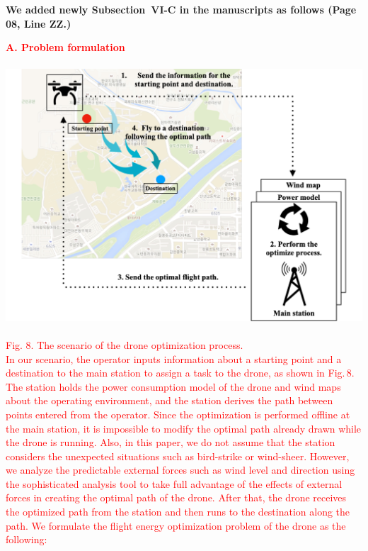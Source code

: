 \documentclass[onecolumn]{IEEEconf}
\begin{document}
\begin{description}
{	}
	~\\
	~\\
	\textbf{We added newly Subsection~VI-C in the manuscripts as follows (Page 08, Line ZZ.)}\\
    \begin{mdframed}[ linewidth=.75pt, userdefinedwidth=0.9\textwidth]
    \textbf{\justify\textcolor{red}{A. Problem formulation}}~\\
    ~\\
    \includegraphics[scale=0.34]{fig8/problem_formulation.pdf}~\\
    \textcolor{red}{Fig. 8. The scenario of the drone optimization process.}~\\
    \justify\textcolor{red}{In our scenario, the operator inputs information about a starting point and a destination to the main station to assign a task to the drone, as shown in Fig.\,8.
    The station holds the power consumption model of the drone and wind maps about the operating environment, and the station derives the path between points entered from the operator.
    Since the optimization is performed offline at the main station, it is impossible to modify the optimal path already drawn while the drone is running. Also, in this paper, we do not assume that the station considers the unexpected situations such as bird-strike or wind-sheer.
    However, we analyze the predictable external forces such as wind level and direction using the sophisticated analysis tool to take full advantage of the effects of external forces in creating the optimal path of the drone. 
    After that, the drone receives the optimized path from the station and then runs to the destination along the path. We formulate the flight energy optimization problem of the drone as the following:}


\end{mdframed}
\end{description}
\end{document}

